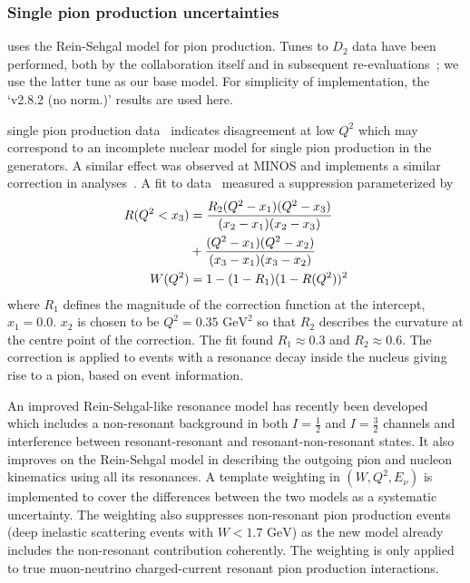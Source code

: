 \subsubsection{Single pion production uncertainties}
 uses the Rein-Sehgal model for pion production. Tunes to $D_2$ data have been performed, both by the  collaboration itself and in subsequent re-evaluations~\cite{Rodrigues:2016xjj}; we use the latter tune as our base model. For simplicity of implementation, the `v2.8.2 (no norm.)' results are used here. %

\minerva single pion production data~\cite{Altinok:2017xua,McGivern:2016bwh,Eberly:2014mra} indicates disagreement at low $Q^2$ which may correspond to an incomplete nuclear model for single pion production in the generators. A similar effect was observed at MINOS\cite{minos_pi_q2} and \nova implements a similar correction in analyses~\cite{nova_2018}.
A fit to \minerva data~\cite{StowellThesis} measured a suppression parameterized by
\begin{align}
R(Q^2<x_3) & = \frac{R_{2} (Q^2-x_1)(Q^2-x_3)}{(x_2-x_1)(x_2-x_3)} \notag\\
             & + \frac{(Q^2-x_1)(Q^2-x_2)}{(x_3-x_1)(x_3-x_2)}  \\
W(Q^{2}) &= 1-(1-R_{1})(1-R(Q^{2}))^{2}
\end{align}
where $R_{1}$ defines the magnitude of the correction function at the intercept, $x_{1}=0.0$. $x_{2}$ is chosen to be $Q^2=0.35\text{ GeV}^2$ so that $R_{2}$ describes the curvature at the centre point of the correction. The fit found $R_1\approx0.3$ and $R_2\approx0.6$. The correction is applied to events with a resonance decay inside the nucleus giving rise to a pion, based on  event information.

An improved Rein-Sehgal-like resonance model has recently been developed~\cite{minoo} which includes a non-resonant background in both $I=\frac{1}{2}$ and $I=\frac{3}{2}$ channels and interference between resonant-resonant and resonant-non-resonant states. 
It also improves on the Rein-Sehgal model in describing the outgoing pion and nucleon kinematics using all its resonances.
A template weighting in $(W, Q^2, E_\nu)$ is implemented to cover the differences between the two models as a systematic uncertainty. The weighting also suppresses  non-resonant pion production events (deep inelastic scattering events with $W<1.7\text{ GeV}$) as the new model already includes the non-resonant contribution coherently. 
The weighting is only applied to true muon-neutrino charged-current resonant pion production interactions.

